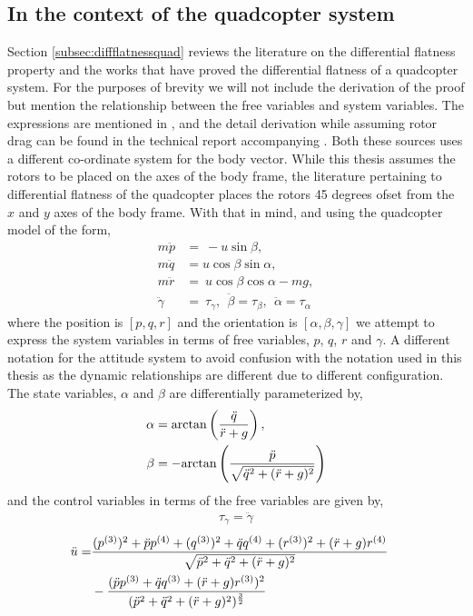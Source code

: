 \documentclass[letterpaper%
, twoside%
, 12pt%
,memoire%
, english%
,creativecommons,hyperref%
]{thETS}
\begin{document}
\subsection{In the context of the quadcopter system}
Section \ref{subsec:diffflatnessquad} reviews the literature on the differential flatness property and the works that have proved the differential flatness of a quadcopter system. For the purposes of brevity we will not include the derivation of the proof but mention the relationship between the free variables and system variables. The expressions are mentioned in \citep{RN81}, and the detail derivation while assuming rotor drag can be found in the technical report accompanying \citep{faessler2017differential}. Both these sources uses a different co-ordinate system for the body vector. While this thesis assumes the rotors to be placed on the axes of the body frame, the literature pertaining to differential flatness of the quadcopter places the rotors 45 degrees ofset from the $x$ and $y$ axes of the body frame. With that in mind, and using the quadcopter model of the form, 
\begin{align}
m\ddot{p} &=\ -u\sin\beta, \\
m\ddot{q} &=u\cos\beta\sin\alpha, \\
m\ddot{r} &=\ u\cos\beta\cos\alpha-mg, \\
\ddot{\gamma} &=\ \tau_{\gamma},\ \ \ddot{\beta}=\tau_{\beta}, \ \ \ddot{\alpha}=\tau_{\alpha}
\end{align}
where the position is $[p,q,r]$ and the orientation is $[\alpha, \beta,\gamma]$ we attempt to express the system variables in terms of free variables, $p$, $q$, $r$ and $\gamma$. A different notation for the attitude system to avoid confusion with the notation used in this thesis as the dynamic relationships are different due to different configuration. The state variables, $\alpha$ and $\beta$ are differentially parameterized by, 
\begin{align*}
\alpha &= {\rm arctan} \left({\ddot{q}\over \ddot{r}+g}\right),\\
\beta &= -{\rm arctan} \left({\ddot{p}\over \sqrt{\ddot{q}^{2}+(\ddot{r}+g)^{2}}}\right)
\end{align*} and the control variables in terms of the free variables are given by,
\begin{align} \label{eqn:taupsi}
\tau_{\gamma}=\ddot{\gamma}
\end{align} 
\begin{align} 
\ddot{u} =& {(p^{(3)})^{2}+\ddot{p}p^{(4)}+(q^{(3)})^{2}+\ddot{q}q^{(4)}+(r^{(3)})^{2}+(\ddot{r}+g)r^{(4)}\over \sqrt{\ddot{p}^{2}+\ddot{q}^{2}+(\ddot{r}+g)^{2}}}\cr &-{(\ddot{p}p^{(3)}+\ddot{q}q^{(3)}+(\ddot{r}+g)r^{(3)})^{2}\over (\ddot{p}^{{2}}+\ddot{q}^{{2}}+(\ddot{r}+g)^{2})^{{3\over 2}}}
\end{align}
\end{document}

